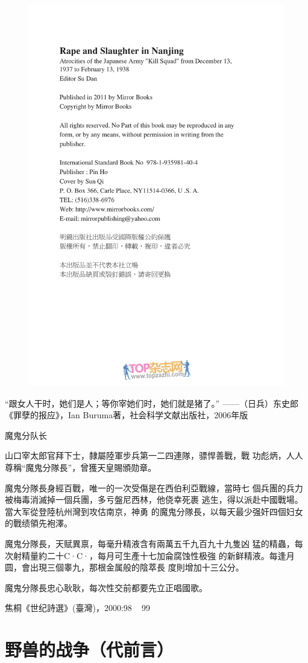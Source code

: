 \documentclass[12pt,UTF8]{ctexbook}
\begin{document}
\begin{figure}[htbp]
	\centering
	\includegraphics[width=0.7\linewidth]{cover2}
	\caption{}
	\label{fig:1}
\end{figure}

“跟女人干时，她们是人；等你宰她们时，她们就是猪了。”
——（日兵）东史郎《罪孽的报应》，Ian Buruma著，社会科学文献出版社，2006年版

魔鬼分队长

山口宰太郎官拜下士，隸屬陸軍步兵第一二四連隊，骠悍善戰，戰
功彪炳，人人尊稱“魔鬼分隊長”，曾獲天皇賜頒勋章。

魔鬼分隊長身經百戰，唯一的一次受傷是在西伯利亞戰線，當時七
個兵團的兵力被梅毒消滅掉一個兵團，多亏盤尼西林，他侥幸死裹
逃生，得以派赴中國戰場。當大军從登陸杭州灣到攻估南京，神勇
的魔鬼分隊長，以每天最少强奸四個妇女的戰绩領先袍澤。

魔鬼分隊長，天赋異禀，每毫升精液含有兩萬五千九百九十九隻凶
猛的精蟲，每次射精量約二十C·C·，每月可生產十七加侖腐蚀性极強
的新鲜精液。每逢月圆，會出現三個睾九，那根金属般的陰萃長
度則增加十三公分。

魔鬼分隊長忠心耿耿，每次性交前都要先立正唱國歌。

焦桐《世纪詩選》(臺灣)，2000:98 ~ 99

\chapter{野兽的战争（代前言）}
\end{document}
